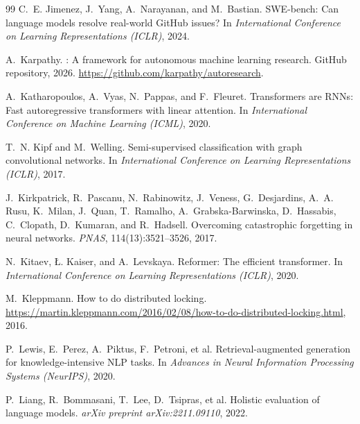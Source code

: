 \documentclass[conference]{IEEEtran}
\begin{document}
\begin{thebibliography}{99}
C.~E. Jimenez, J.~Yang, A.~Narayanan, and M.~Bastian.
\newblock SWE-bench: Can language models resolve real-world GitHub issues?
\newblock In \emph{International Conference on Learning Representations (ICLR)}, 2024.

A.~Karpathy.
: A framework for autonomous machine learning research.
\newblock GitHub repository, 2026.
\newblock \url{https://github.com/karpathy/autoresearch}.

A.~Katharopoulos, A.~Vyas, N.~Pappas, and F.~Fleuret.
\newblock Transformers are RNNs: Fast autoregressive transformers with linear attention.
\newblock In \emph{International Conference on Machine Learning (ICML)}, 2020.

T.~N. Kipf and M.~Welling.
\newblock Semi-supervised classification with graph convolutional networks.
\newblock In \emph{International Conference on Learning Representations (ICLR)}, 2017.

J.~Kirkpatrick, R.~Pascanu, N.~Rabinowitz, J.~Veness, G.~Desjardins, A.~A. Rusu, K.~Milan, J.~Quan, T.~Ramalho, A.~Grabska-Barwinska, D.~Hassabis, C.~Clopath, D.~Kumaran, and R.~Hadsell.
\newblock Overcoming catastrophic forgetting in neural networks.
\newblock \emph{PNAS}, 114(13):3521--3526, 2017.

N.~Kitaev, {\L}. Kaiser, and A.~Levskaya.
\newblock Reformer: The efficient transformer.
\newblock In \emph{International Conference on Learning Representations (ICLR)}, 2020.

M.~Kleppmann.
\newblock How to do distributed locking.
\newblock \url{https://martin.kleppmann.com/2016/02/08/how-to-do-distributed-locking.html}, 2016.

P.~Lewis, E.~Perez, A.~Piktus, F.~Petroni, et al.
\newblock Retrieval-augmented generation for knowledge-intensive NLP tasks.
\newblock In \emph{Advances in Neural Information Processing Systems (NeurIPS)}, 2020.

P.~Liang, R.~Bommasani, T.~Lee, D.~Tsipras, et al.
\newblock Holistic evaluation of language models.
\newblock \emph{arXiv preprint arXiv:2211.09110}, 2022.


\end{thebibliography}
\end{document}
